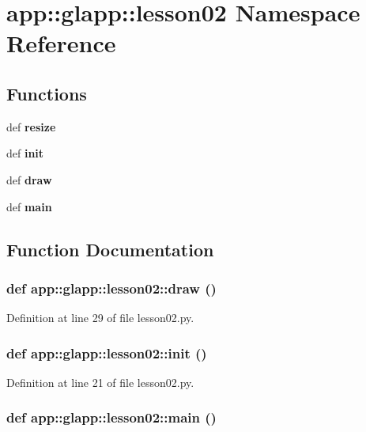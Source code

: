 \section{app::glapp::lesson02 Namespace Reference}
\label{namespaceapp_1_1glapp_1_1lesson02}


\subsection*{Functions}
\begin{CompactItemize}
\item 
def {\bf resize}
\item 
def {\bf init}
\item 
def {\bf draw}
\item 
def {\bf main}
\end{CompactItemize}


\subsection{Function Documentation}
\subsubsection{\setlength{\rightskip}{0pt plus 5cm}def app::glapp::lesson02::draw ()}\label{namespaceapp_1_1glapp_1_1lesson02_b287a7f2dce64a1309556d5861b4e74b}




Definition at line 29 of file lesson02.py.
\subsubsection{\setlength{\rightskip}{0pt plus 5cm}def app::glapp::lesson02::init ()}\label{namespaceapp_1_1glapp_1_1lesson02_be56314cf579428889192b8ff8cce7bb}




Definition at line 21 of file lesson02.py.
\subsubsection{\setlength{\rightskip}{0pt plus 5cm}def app::glapp::lesson02::main ()}\label{namespaceapp_1_1glapp_1_1lesson02_a41b48a2a26c1f446eedbd8a4bd9bd1c}




